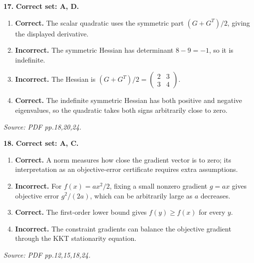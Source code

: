 \documentclass[11pt,a4paper]{article}
\begin{document}
\par\noindent\begin{minipage}{\linewidth}
\textbf{17.} \textbf{Correct set: A, D.}
\begin{enumerate}[label=(\Alph*),leftmargin=8mm,itemsep=2pt,topsep=2pt]
\item \textbf{Correct.} The scalar quadratic uses the symmetric part \((G+G^T)/2\), giving the displayed derivative.
\item \textbf{Incorrect.} The symmetric Hessian has determinant \(8-9=-1\), so it is indefinite.
\item \textbf{Incorrect.} The Hessian is \((G+G^T)/2=\begin{pmatrix}2&3\\3&4\end{pmatrix}\).
\item \textbf{Correct.} The indefinite symmetric Hessian has both positive and negative eigenvalues, so the quadratic takes both signs arbitrarily close to zero.
\end{enumerate}
{\footnotesize\textit{Source: PDF pp.18,20,24.}}

\end{minipage}\par\vspace{3mm}
\par\noindent\begin{minipage}{\linewidth}
\textbf{18.} \textbf{Correct set: A, C.}
\begin{enumerate}[label=(\Alph*),leftmargin=8mm,itemsep=2pt,topsep=2pt]
\item \textbf{Correct.} A norm measures how close the gradient vector is to zero; its interpretation as an objective-error certificate requires extra assumptions.
\item \textbf{Incorrect.} For \(f(x)=a x^2/2\), fixing a small nonzero gradient \(g=ax\) gives objective error \(g^2/(2a)\), which can be arbitrarily large as \(a\) decreases.
\item \textbf{Correct.} The first-order lower bound gives \(f(y)\ge f(x)\) for every \(y\).
\item \textbf{Incorrect.} The constraint gradients can balance the objective gradient through the KKT stationarity equation.
\end{enumerate}
{\footnotesize\textit{Source: PDF pp.12,15,18,24.}}

\end{minipage}\par\vspace{3mm}
\end{document}
